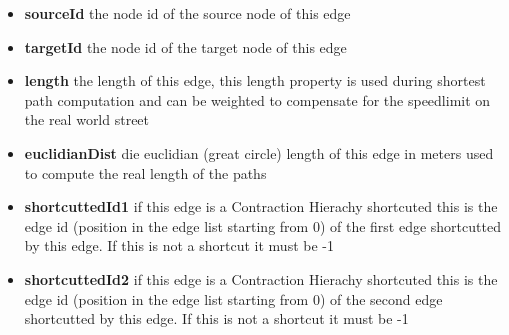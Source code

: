 \documentclass[ngerman,titlepage,parskip=true]{scrartcl}
\begin{document}
\begin{itemize}
 \item \textbf{sourceId} the node id of the source node of this edge
 \item \textbf{targetId} the node id of the target node of this edge
 \item \textbf{length} the length of this edge, this length property is used during shortest path computation and
 can be weighted to compensate for the speedlimit on the real world street
 \item \textbf{euclidianDist} die euclidian (great circle) length of this edge in meters used to compute the real length of the paths
 \item \textbf{shortcuttedId1} if this edge is a Contraction Hierachy shortcuted this is the edge id (position in the edge list starting from 0) of the
 first edge shortcutted by this edge. If this is not a shortcut it must be -1
 \item \textbf{shortcuttedId2} if this edge is a Contraction Hierachy shortcuted this is the edge id (position in the edge list starting from 0) of the
 second edge shortcutted by this edge. If this is not a shortcut it must be -1
\end{itemize}
\end{document}
